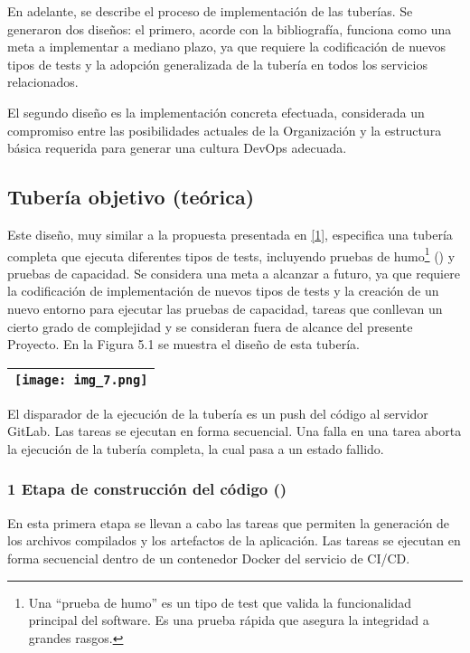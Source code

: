 En adelante, se describe el proceso de implementación de las
tuberías. Se generaron dos diseños: el primero, acorde con la
bibliografía, funciona como una meta a implementar a mediano plazo, ya
que requiere la codificación de nuevos tipos de tests y la adopción
generalizada de la tubería en todos los servicios relacionados.

El segundo diseño es la implementación concreta efectuada, considerada
un compromiso entre las posibilidades actuales de la Organización y la
estructura básica requerida para generar una cultura DevOps adecuada.

\subsection{Tubería objetivo (teórica)}

Este diseño, muy similar a la propuesta presentada en
\href{https://www.zotero.org/google-docs/?lBK1S4}{[1]}, especifica una
tubería completa que ejecuta diferentes tipos de tests, incluyendo
pruebas de humo\footnote{ Una ``prueba de humo'' es un tipo de test que
  valida la funcionalidad principal del software. Es una prueba rápida
  que asegura la integridad a grandes rasgos.} ()
y pruebas de capacidad. Se considera una meta a alcanzar a futuro, ya
que requiere la codificación de implementación de nuevos tipos de
tests y la creación de un nuevo entorno para ejecutar las pruebas de
capacidad, tareas que conllevan un cierto grado de complejidad y se
consideran fuera de alcance del presente Proyecto. En la Figura 5.1 se
muestra el diseño de esta tubería.

\begin{tabular}{|l|}
\hline \texttt{[image: img\_7.png]}


\e{Figura 5.1. Tubería teórica} \\ \hline
\end{tabular}
El disparador de la ejecución de la tubería es un push del código al
servidor GitLab. Las tareas se ejecutan en forma secuencial. Una falla
en una tarea aborta la ejecución de la tubería completa, la cual pasa
a un estado fallido.

\subsubsection{1 Etapa de construcción del código ()}

En esta primera etapa se llevan a cabo las tareas que permiten la
generación de los archivos compilados y los artefactos de la
aplicación. Las tareas se ejecutan en forma secuencial dentro de un
contenedor Docker del servicio de CI/CD.

